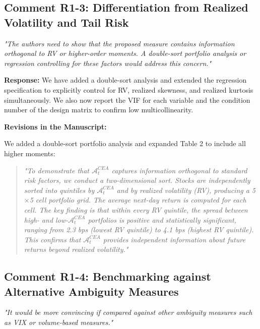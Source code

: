 \documentclass[12pt]{article}
\begin{document}
\subsection*{Comment R1-3: Differentiation from Realized Volatility and Tail Risk}
\textit{"The authors need to show that the proposed measure contains information orthogonal to RV or higher-order moments. A double-sort portfolio analysis or regression controlling for these factors would address this concern."}

\begin{highlightbox}
\textbf{Response:} We have added a double-sort analysis and extended the regression specification to explicitly control for RV, realized skewness, and realized kurtosis simultaneously. We also now report the VIF for each variable and the condition number of the design matrix to confirm low multicollinearity.
\end{highlightbox}

\begin{highlightbox}
\textbf{Revisions in the Manuscript:}

We added a double-sort portfolio analysis and expanded Table 2 to include all higher moments:
\vspace{0.2cm}
\begin{quote}
\itshape "To demonstrate that $\mathcal{A}^{CEA}_t$ captures information orthogonal to standard risk factors, we conduct a two-dimensional sort. Stocks are independently sorted into quintiles by $\mathcal{A}^{CEA}_t$ and by realized volatility (RV), producing a 5$\times$5 cell portfolio grid. The average next-day return is computed for each cell. The key finding is that within every RV quintile, the spread between high- and low-$\mathcal{A}^{CEA}_t$ portfolios is positive and statistically significant, ranging from 2.3 bps (lowest RV quintile) to 4.1 bps (highest RV quintile). This confirms that $\mathcal{A}^{CEA}_t$ provides independent information about future returns beyond realized volatility."
\end{quote}
\end{highlightbox}

\subsection*{Comment R1-4: Benchmarking against Alternative Ambiguity Measures}
\textit{"It would be more convincing if compared against other ambiguity measures such as VIX or volume-based measures."}
\end{document}
